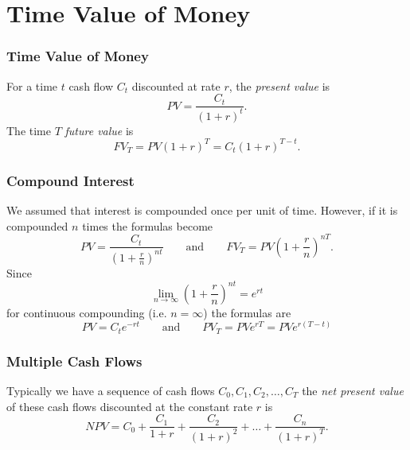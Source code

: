\documentclass{beamer}
\begin{document}
\section{Time Value of Money}

\begin{frame}
\frametitle{Time Value of Money}

For a time $t$ cash flow $C_t$ discounted at rate $r$, the {\it present value} is
$$
PV = \frac{C_t}{(1 + r)^t}.
$$
The time $T$ {\it future value} is
$$
FV_T = PV (1 + r)^T = C_t (1 + r)^{T- t}.
$$
\end{frame}

\begin{frame}
\frametitle{Compound Interest}
\small 
We assumed that interest is compounded once per unit of time. However, if it is compounded $n$ times the formulas become
$$
PV = \frac{C_t}{\left(1 + \frac{r}{n}\right)^{nt}}\qquad\text{and}\qquad FV_T = PV \left(1 + \frac{r}{n}\right)^{nT}.
$$
Since
$$
\lim_{n\to\infty} \left(1 + \frac{r}{n}\right)^{nt} = e^{rt}
$$
for continuous compounding (i.e. $n = \infty$) the formulas are
$$
PV = C_t e^{-rt} \qquad\text{and}\qquad PV_T = PV  e^{rT} = PV  e^{r(T - t)}
$$
\end{frame}

\begin{frame}
\frametitle{Multiple Cash Flows} 
Typically we have a sequence of cash flows $C_0, C_1, C_2,\ldots, C_T$ the {\it net present value} of these cash flows discounted at the constant rate $r$ is
$$
NPV = C_0 + \frac{C_1}{1 + r} + \frac{C_2}{(1 + r)^2} + \ldots + \frac{C_n}{(1 + r)^T}.
$$
\end{frame}
\end{document}
